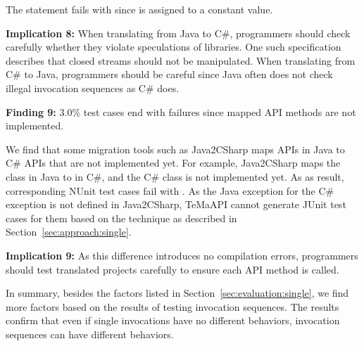 The  statement fails with  since  is assigned to a constant value.

\textbf{Implication 8:} When translating from Java to C\#, programmers should check carefully whether they violate speculations of libraries. One such specification describes that closed streams should not be manipulated. When translating from C\# to Java, programmers should be careful since Java often does not check illegal invocation sequences as C\# does.


\textbf{Finding 9:} 3.0\% test cases end with failures since mapped API methods are not implemented.

We find that some migration tools such as Java2CSharp maps APIs in Java to C\# APIs that are not implemented yet. For example, Java2CSharp maps the  class in Java to  in C\#, and the C\# class is not implemented yet. As as result, corresponding NUnit test cases fail with . As the Java exception for the C\# exception is not defined in Java2CSharp, TeMaAPI cannot generate JUnit test cases for them based on the technique as described in Section~\ref{sec:approach:single}.

\textbf{Implication 9:} As this difference introduces no compilation errors, programmers should test translated projects carefully to ensure each API method is called.

In summary, besides the factors listed in Section~\ref{sec:evaluation:single}, we find more factors based on the results of testing invocation sequences. The results confirm that even if single invocations have no different behaviors, invocation sequences can have different behaviors.


